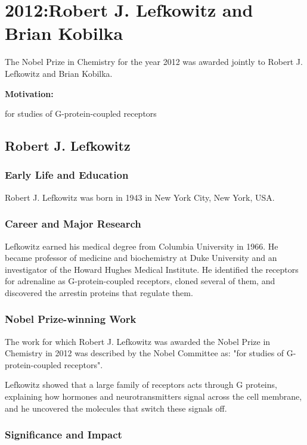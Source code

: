\chapter{2012:Robert J. Lefkowitz and Brian Kobilka}

\label{chap:chemistry2012}

The Nobel Prize in Chemistry for the year 2012 was awarded jointly to Robert J. Lefkowitz and Brian Kobilka.

\textbf{Motivation:}

for studies of G-protein-coupled receptors

\section{Robert J. Lefkowitz}

\subsection*{Early Life and Education}

Robert J. Lefkowitz was born in 1943 in New York City, New York, USA.

\subsection*{Career and Major Research}

Lefkowitz earned his medical degree from Columbia University in 1966. He became professor of medicine and biochemistry at Duke University and an investigator of the Howard Hughes Medical Institute. He identified the receptors for adrenaline as G-protein-coupled receptors, cloned several of them, and discovered the arrestin proteins that regulate them.

\subsection*{Nobel Prize-winning Work}

The work for which Robert J. Lefkowitz was awarded the Nobel Prize in Chemistry in 2012 was described by the Nobel Committee as: "for studies of G-protein-coupled receptors".

Lefkowitz showed that a large family of receptors acts through G proteins, explaining how hormones and neurotransmitters signal across the cell membrane, and he uncovered the molecules that switch these signals off.

\subsection*{Significance and Impact}

